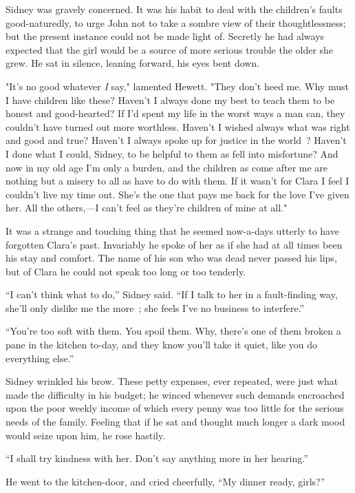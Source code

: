 Sidney was gravely concerned. It was his habit to deal with the
children's faults good-naturedly, to urge John not to take a sombre view
of their thoughtlessness; but the present instance could not be made
light of. Secretly he had always expected that the girl would be a
source of more serious trouble the older she grew. He sat in silence,
leaning forward, his eyes bent down.

"It's no good whatever \emph{I} say," lamented Hewett. "They don't heed
me. Why must I have children like these? Haven't I always done my best
to teach them to be honest and good-hearted? If I'd spent my life in the
worst ways a man can, they couldn't have turned out more worthless.
Haven't I wished always what was right and good and true? Haven't I
always spoke up for justice in the {} world~? Haven't I done what I
could, Sidney, to be helpful to them as fell into misfortune? And now in
my old age I'm only a burden, and the children as come after me are
nothing but a misery to all as have to do with them. If it wasn't for
Clara I feel I couldn't live my time out. She's the one that pays me
back for the love I've given her. All the others,---I can't feel as
they're children of mine at all."

It was a strange and touching thing that he seemed now-a-days utterly to
have forgotten Clara's past. Invariably he spoke of her as if she had at
all times been his stay and comfort. The name of his son who was dead
never passed his lips, but of Clara he could not speak too long or too
tenderly.

``I can't think what to do,'' Sidney said. ``If I talk to her in a
fault-finding way, she'll only dislike me the more~; she feels I've no
business to interfere.''

``You're too soft with them. You spoil them. Why, there's one of them
broken a pane in the kitchen to-day, and they know you'll take it quiet,
like you do everything else.''

Sidney wrinkled his brow. These petty expenses, ever repeated, were just
what made {} the difficulty in his budget; he winced whenever such
demands encroached upon the poor weekly income of which every penny was
too little for the serious needs of the family. Feeling that if he sat
and thought much longer a dark mood would seize upon him, he rose
hastily.

``I shall try kindness with her. Don't say anything more in her
hearing.''

He went to the kitchen-door, and cried cheerfully, ``My dinner ready,
girls?''

